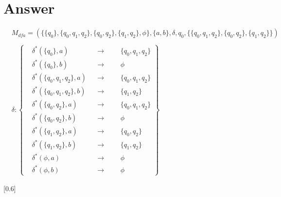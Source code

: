 \documentclass{assignment-x}
\begin{document}
\pagebreak

\section{Answer}

\begin{align*}
&M_{dfa} = (\{\{q_0\},\{q_0,q_1,q_2\},\{q_0,q_2\},\{q_1,q_2\},\phi\},\{a,b\},\delta,q_0,\{\{q_0,q_1,q_2\},\{q_0,q_2\},\{q_1,q_2\}\}) \\ \\
&\delta: 
\left\{
\begin{aligned}
&\delta^*(\{q_0\},a) &&\rightarrow &&&\{q_0,q_1,q_2\}  \\
&\delta^*(\{q_0\},b) &&\rightarrow &&&\phi \\
&\delta^*(\{q_0,q_1,q_2\},a) &&\rightarrow &&&\{q_0,q_1,q_2\} \\
&\delta^*(\{q_0,q_1,q_2\},b) &&\rightarrow &&&\{q_1,q_2\} \\
&\delta^*(\{q_0,q_2\},a) &&\rightarrow &&&\{q_0,q_1,q_2\} \\
&\delta^*(\{q_0,q_2\},b) &&\rightarrow &&&\phi \\
&\delta^*(\{q_1,q_2\},a) &&\rightarrow &&&\{q_0,q_2\} \\
&\delta^*(\{q_1,q_2\},b) &&\rightarrow &&&\{q_1,q_2\} \\
&\delta^*(\phi,a) &&\rightarrow &&&\phi \\
&\delta^*(\phi,b) &&\rightarrow &&&\phi 
\end{aligned}
\right\}
\end{align*}

[0.6\linewidth]
\end{document}
